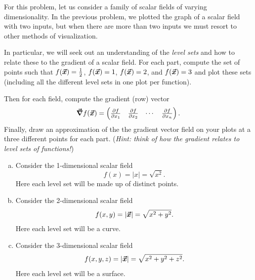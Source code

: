 \documentclass[12pt]{article} %
\begin{document}
\newpage
\begin{problem}
For this problem, let us consider a family of scalar fields of varying dimensionality. In the previous problem, we plotted the graph of a scalar field with two inputs, but when there are more than two inputs we must resort to other methods of visualization.

In particular, we will seek out an understanding of the \emph{level sets} and how to relate these to the gradient of a scalar field. For each part, compute the set of points such that $f(\boldsymbol{\vec{x}})=\frac{1}{2}$, $f(\boldsymbol{\vec{x}})=1$, $f(\boldsymbol{\vec{x}})=2$, and $f(\boldsymbol{\vec{x}})=3$ and plot these sets (including all the different level sets in one plot per function).

Then for each field, compute the gradient (row) vector
\[
\boldsymbol{\vec{\nabla}} f(\boldsymbol{\vec{x}}) = \begin{pmatrix} \frac{\partial f}{\partial x_1} & \frac{\partial f}{\partial x_2} & \cdots & \frac{\partial f}{\partial x_n}\end{pmatrix}.
\]
Finally, draw an approximation of the the gradient vector field on your plots at a three different points for each part. (\emph{Hint: think of how the gradient relates to level sets of functions!})
\begin{enumerate}[(a)]
	\item Consider the 1-dimensional scalar field
	\[
	f(x) = |x| = \sqrt{x^2}.
	\]
	Here each level set will be made up of distinct points.
	\item Consider the 2-dimensional scalar field
	\[
	f(x,y) = |\boldsymbol{\vec{x}}| = \sqrt{x^2+y^2}.
	\]
	Here each level set will be a curve.
	\item Consider the 3-dimensional scalar field
		\[
		f(x,y,z) = |\boldsymbol{\vec{x}}| = \sqrt{x^2+y^2+z^2}.
		\]
		Here each level set will be a surface.
\end{enumerate}
\end{problem}
\end{document}
